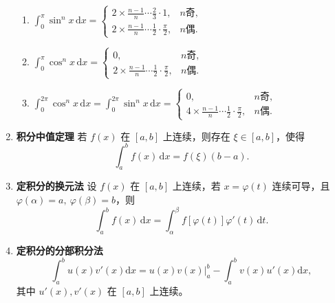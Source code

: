 \begin{enumerate}
\begin{enumerate}
              \item $\displaystyle \int_{0}^{\pi}\!\sin^n x\,\mathrm{d}x=
                        \begin{cases}
                            2\!\times\!\frac{n-1}{n}\!\cdots\!\frac{2}{3}\cdot1,             & n\text{奇}, \\[4pt]
                            2\!\times\!\frac{n-1}{n}\!\cdots\!\frac{1}{2}\cdot\frac{\pi}{2}, & n\text{偶}.
                        \end{cases}$

              \item $\displaystyle \int_{0}^{\pi}\!\cos^n x\,\mathrm{d}x=
                        \begin{cases}
                            0,                                                               & n\text{奇}, \\[4pt]
                            2\!\times\!\frac{n-1}{n}\!\cdots\!\frac{1}{2}\cdot\frac{\pi}{2}, & n\text{偶}.
                        \end{cases}$

              \item $\displaystyle \int_{0}^{2\pi}\!\cos^n x\,\mathrm{d}x
                        =\int_{0}^{2\pi}\!\sin^n x\,\mathrm{d}x
                        =\begin{cases}
                            0,                                                               & n\text{奇}, \\[4pt]
                            4\!\times\!\frac{n-1}{n}\!\cdots\!\frac{1}{2}\cdot\frac{\pi}{2}, & n\text{偶}.
                        \end{cases}$
          \end{enumerate}

    \item \textbf{积分中值定理}
          若 $f(x)$ 在 $[a,b]$ 上连续，则存在 $\xi\in[a,b]$，使得
          $$
              \int_{a}^{b}f(x)\,\mathrm{d}x=f(\xi)(b-a).
          $$

    \item \textbf{定积分的换元法}
          设 $f(x)$ 在 $[a,b]$ 上连续，若 $x=\varphi(t)$ 连续可导，且 $\varphi(\alpha)=a,\ \varphi(\beta)=b$，则
          $$
              \int_{a}^{b}f(x)\,\mathrm{d}x=\int_{\alpha}^{\beta}f[\varphi(t)]\varphi'(t)\,\mathrm{d}t.
          $$

    \item \textbf{定积分的分部积分法}
          $$
              \int_{a}^{b}u(x)v'(x)\mathrm{d}x
              =u(x)v(x)\Big|_{a}^{b}-\int_{a}^{b}v(x)u'(x)\mathrm{d}x,
          $$
          其中 $u'(x),v'(x)$ 在 $[a,b]$ 上连续。


\end{enumerate}
